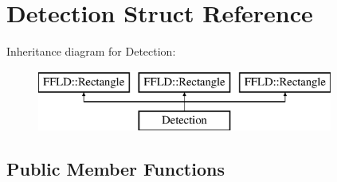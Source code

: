 \hypertarget{struct_detection}{\section{Detection Struct Reference}
\label{struct_detection}
}
Inheritance diagram for Detection\-:\begin{figure}[H]
\begin{center}
\leavevmode
\includegraphics[height=2.000000cm]{struct_detection}
\end{center}
\end{figure}
\subsection*{Public Member Functions}
